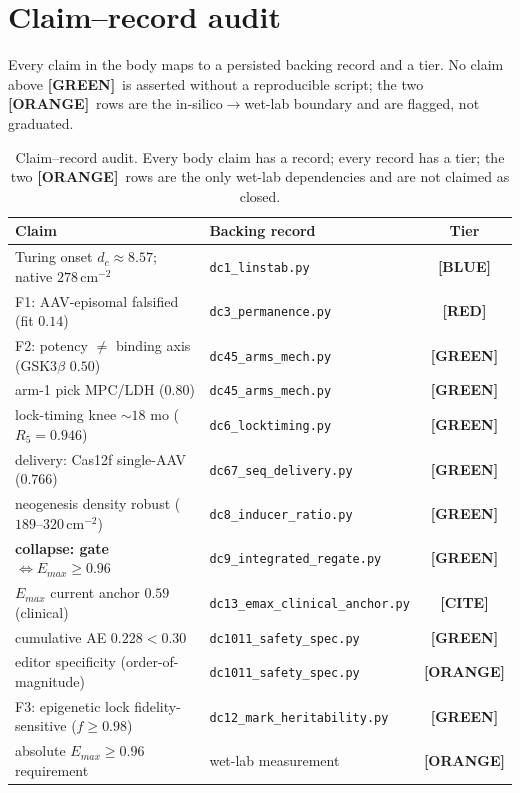 \documentclass[11pt,a4paper]{article}
\newcommand{\tierbadge}[2]{\textcolor{#1}{\textbf{[#2]}}}
\providecommand{\tierBlue}{\tierbadge{blue!60!black}{BLUE}}
\providecommand{\tierGreen}{\tierbadge{green!45!black}{GREEN}}
\providecommand{\tierYellow}{\tierbadge{yellow!50!black}{CITE}}
\providecommand{\tierOrange}{\tierbadge{orange!80!black}{ORANGE}}
\providecommand{\tierRed}{\tierbadge{red!75!black}{RED}}
\begin{document}
\appendix
\section{Claim--record audit}
\label{app:audit}

Every claim in the body maps to a persisted backing record and a tier. No claim
above \tierGreen\ is asserted without a reproducible script; the two \tierOrange\
rows are the in-silico$\to$wet-lab boundary and are flagged, not graduated.

\begin{table}[h]
\centering\small
\begin{tabular}{@{}>{\raggedright\arraybackslash}m{6.6cm} >{\raggedright\arraybackslash}m{4.4cm} c@{}}
\toprule
\textbf{Claim} & \textbf{Backing record} & \textbf{Tier} \\
\midrule
Turing onset $d_c\approx 8.57$; native $278$\,cm$^{-2}$         & \texttt{dc1\_linstab.py}        & \tierBlue \\
F1: AAV-episomal falsified (fit $0.14$)                         & \texttt{dc3\_permanence.py}     & \tierRed \\
F2: potency $\neq$ binding axis (GSK3$\beta$ $0.50$)            & \texttt{dc45\_arms\_mech.py}    & \tierGreen \\
arm-1 pick MPC/LDH ($0.80$)                                     & \texttt{dc45\_arms\_mech.py}    & \tierGreen \\
lock-timing knee ${\sim}18$ mo ($R_5=0.946$)                   & \texttt{dc6\_locktiming.py}     & \tierGreen \\
delivery: Cas12f single-AAV ($0.766$)                          & \texttt{dc67\_seq\_delivery.py} & \tierGreen \\
neogenesis density robust ($189$--$320$\,cm$^{-2}$)            & \texttt{dc8\_inducer\_ratio.py} & \tierGreen \\
\textbf{collapse: gate $\Leftrightarrow E_{max}\geq 0.96$}      & \texttt{dc9\_integrated\_regate.py} & \tierGreen \\
$E_{max}$ current anchor $0.59$ (clinical)                      & \texttt{dc13\_emax\_clinical\_anchor.py} & \tierYellow \\
cumulative AE $0.228<0.30$                                      & \texttt{dc1011\_safety\_spec.py}& \tierGreen \\
editor specificity (order-of-magnitude)                         & \texttt{dc1011\_safety\_spec.py}& \tierOrange \\
F3: epigenetic lock fidelity-sensitive ($f\geq 0.98$)          & \texttt{dc12\_mark\_heritability.py} & \tierGreen \\
absolute $E_{max}\geq 0.96$ requirement                         & wet-lab measurement             & \tierOrange \\
\bottomrule
\end{tabular}
\caption{Claim--record audit. Every body claim has a record; every record has a
tier; the two \tierOrange\ rows are the only wet-lab dependencies and are not
claimed as closed.}
\label{tab:audit}
\end{table}
\end{document}
